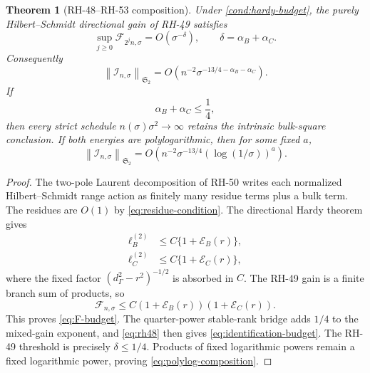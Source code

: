 \documentclass[11pt]{article}
\newtheorem{theorem}{Theorem}[section]
\theoremstyle{definition}
\theoremstyle{remark}
\newcommand{\HS}{\mathfrak S_2}
\newcommand{\cE}{\mathcal E}
\newcommand{\cF}{\mathcal F}
\newcommand{\cI}{\mathcal I}
\newcommand{\norm}[1]{\left\lVert #1\right\rVert}
\begin{document}
\begin{theorem}[RH-48--RH-53 composition]
\label{thm:composition}
Under \cref{cond:hardy-budget}, the purely Hilbert--Schmidt directional gain
of RH-49 satisfies
\begin{equation}
 \sup_{j\ge0}\cF_{2^jn,\sigma}
 =O(\sigma^{-\delta}),
 \qquad
 \delta=\alpha_B+\alpha_C.
 \label{eq:F-budget}
\end{equation}
Consequently
\begin{equation}
 \boxed{
 \norm{\cI_{n,\sigma}}_{\HS}
 =O\!\left(
 n^{-2}\sigma^{-13/4-\alpha_B-\alpha_C}
 \right).}
 \label{eq:identification-budget}
\end{equation}
If
\begin{equation}
 \alpha_B+\alpha_C\le\frac14,
 \label{eq:quarter-budget}
\end{equation}
then every strict schedule $n(\sigma)\sigma^2\to\infty$ retains the
intrinsic bulk-square conclusion.  If both energies are polylogarithmic,
then for some fixed $a$,
\begin{equation}
 \norm{\cI_{n,\sigma}}_{\HS}
 =O\!\left(
 n^{-2}\sigma^{-13/4}(\log(1/\sigma))^a
 \right).
 \label{eq:polylog-composition}
\end{equation}
\end{theorem}

\begin{proof}
The two-pole Laurent decomposition of RH-50 writes each normalized
Hilbert--Schmidt range action as finitely many residue terms plus a bulk
term.  The residues are $O(1)$ by \eqref{eq:residue-condition}.  The
directional Hardy theorem gives
\begin{align*}
 \ell_B^{(2)}
 &\le C\{1+\cE_B(r)\},\\
 \ell_C^{(2)}
 &\le C\{1+\cE_C(r)\},
\end{align*}
where the fixed factor $(d_\Gamma^2-r^2)^{-1/2}$ is absorbed in $C$.
The RH-49 gain is a finite branch sum of products, so
\begin{equation}
 \cF_{n,\sigma}
 \le C(1+\cE_B(r))(1+\cE_C(r)).
 \label{eq:hardy-product}
\end{equation}
This proves \eqref{eq:F-budget}.  The quarter-power stable-rank bridge adds
$1/4$ to the mixed-gain exponent, and \eqref{eq:rh48} then gives
\eqref{eq:identification-budget}.  The RH-49 threshold is precisely
$\delta\le1/4$.  Products of fixed logarithmic powers remain a fixed
logarithmic power, proving \eqref{eq:polylog-composition}.
\end{proof}
\end{document}
